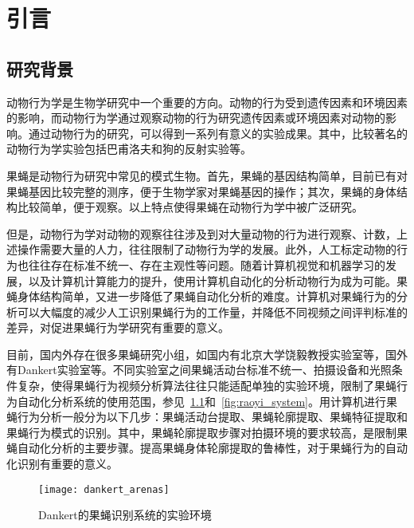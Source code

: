 
\chapter{引言}
\label{chap:introduction}

\section{研究背景}

动物行为学是生物学研究中一个重要的方向\cite{book_animal_behavior}。动物的行为受到遗传因素和环境因素的影响，而动物行为学通过观察动物的行为研究遗传因素或环境因素对动物的影响。通过动物行为的研究，可以得到一系列有意义的实验成果。其中，比较著名的动物行为学实验包括巴甫洛夫和狗的反射实验\cite{conditional_reflexes}等。

果蝇是动物行为研究中常见的模式生物。首先，果蝇的基因结构简单，目前已有对果蝇基因比较完整的测序，便于生物学家对果蝇基因的操作\cite{tweedie2009flybase}；其次，果蝇的身体结构比较简单，便于观察\cite{dankert2009automated}。以上特点使得果蝇在动物行为学中被广泛研究。

但是，动物行为学对动物的观察往往涉及到对大量动物的行为进行观察、计数，上述操作需要大量的人力，往往限制了动物行为学的发展。此外，人工标定动物的行为也往往存在标准不统一、存在主观性等问题\cite{dankert2009automated}。随着计算机视觉和机器学习的发展\cite{chen2015handbook}，以及计算机计算能力的提升，使用计算机自动化的分析动物行为成为可能。果蝇身体结构简单，又进一步降低了果蝇自动化分析的难度。计算机对果蝇行为的分析可以大幅度的减少人工识别果蝇行为的工作量，并降低不同视频之间评判标准的差异，对促进果蝇行为学研究有重要的意义。

目前，国内外存在很多果蝇研究小组，如国内有北京大学饶毅教授实验室等\cite{zhou2008subset,liu2011social}，国外有Dankert实验室等\cite{dankert2009automated}。不同实验室之间果蝇活动台标准不统一、拍摄设备和光照条件复杂，使得果蝇行为视频分析算法往往只能适配单独的实验环境，限制了果蝇行为自动化分析系统的使用范围，参见~\ref{fig:dankert_system}和~\ref{fig:raoyi_system}。用计算机进行果蝇行为分析一般分为以下几步：果蝇活动台提取、果蝇轮廓提取、果蝇特征提取和果蝇行为模式的识别。其中，果蝇轮廓提取步骤对拍摄环境的要求较高，是限制果蝇自动化分析的主要步骤。提高果蝇身体轮廓提取的鲁棒性，对于果蝇行为的自动化识别有重要的意义。

\begin{figure}
\centering
{}
 {
    \texttt{[image: dankert\_arenas]}
}
\caption{Dankert的果蝇识别系统的实验环境\cite{dankert2009automated}}\label{fig:dankert_system}
\end{figure}

